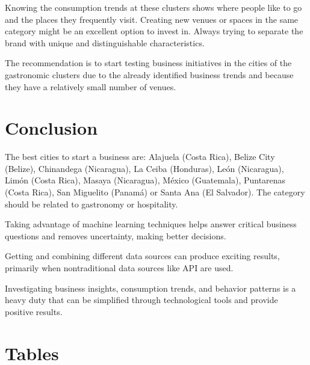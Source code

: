 \documentclass[letterpaper,12pt]{article}
\begin{document}
Knowing the consumption trends at these clusters shows where people like to go and the places they frequently visit. Creating new venues or spaces in the same category might be an excellent option to invest in. Always trying to separate the brand with unique and distinguishable characteristics. 

The recommendation is to start testing business initiatives in the cities of the gastronomic clusters due to the already identified business trends and because they have a relatively small number of venues.

\section{Conclusion}

The best cities to start a business are: Alajuela (Costa Rica), Belize City (Belize), Chinandega (Nicaragua), La Ceiba (Honduras), León (Nicaragua), Limón (Costa Rica), Masaya (Nicaragua), México (Guatemala), Puntarenas (Costa Rica), San Miguelito (Panamá) or Santa Ana (El Salvador). The category should be related to gastronomy or hospitality.

Taking advantage of machine learning techniques helps answer critical business questions and removes uncertainty, making better decisions.

Getting and combining different data sources can produce exciting results, primarily when nontraditional data sources like API are used.

Investigating business insights, consumption trends, and behavior patterns is a heavy duty that can be simplified through technological tools and provide positive results.  

\printbibliography

\pagebreak
\pagebreak
\section{Tables}
\end{document}
